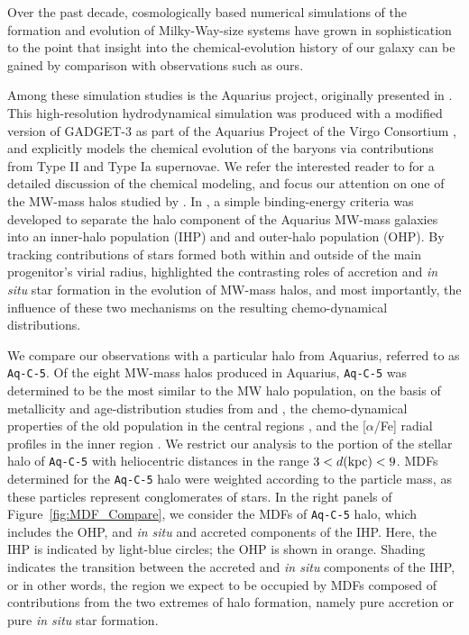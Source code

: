 \documentclass[twocolumn,trackchanges]{aastex63}
\begin{document}
Over the past decade, cosmologically based numerical simulations of the formation and evolution of Milky-Way-size systems have grown in sophistication to the point that insight into the chemical-evolution history of our galaxy can be gained by comparison with observations such as ours.  

Among these simulation studies is the Aquarius project, originally presented in \citet{Scannapieco:2009}. This high-resolution hydrodynamical simulation was produced with a modified version of GADGET-3 \citep{Scannapieco:2005, Scannapieco:2006} as part of the Aquarius Project of the Virgo Consortium \citep{Springel:2008}, and explicitly models the chemical evolution of the baryons via contributions from Type II and Type Ia supernovae. 
We refer the interested reader to \citet{Scannapieco:2009} for a detailed discussion of the chemical modeling, and focus our attention on one of the MW-mass halos studied by \citet{Tissera:2013,Tissera:2014}. In \citet{Tissera:2013}, a simple binding-energy criteria was developed to separate the halo component of the Aquarius MW-mass galaxies into an inner-halo population (IHP) and and outer-halo population (OHP). By tracking contributions of stars formed both within and outside of the main progenitor's virial radius, \citet{Tissera:2014} highlighted the contrasting roles of accretion and \textit{in situ} star formation in the evolution of MW-mass halos, and most importantly, the influence of these two mechanisms on the resulting chemo-dynamical distributions. 

We compare our observations with a particular halo from Aquarius, referred to as \texttt{Aq-C-5}. Of the eight MW-mass halos produced in Aquarius, \texttt{Aq-C-5} was determined to be the most similar to the MW halo population, on the basis of metallicity and age-distribution studies from \citet{Carollo:2018} and \citet{Whitten:2019b}, the chemo-dynamical properties of the old population in the central regions \citep{Tissera:2018}, and the [$\alpha$/Fe] radial profiles in the inner region \citep{Fernandez-Alvar:2019}. We restrict our analysis to the portion of the stellar halo of \texttt{Aq-C-5} with heliocentric distances in the range $3 < d \rm{(kpc)} < 9$. MDFs determined for the \texttt{Aq-C-5} halo were weighted according to the particle mass, as these particles represent conglomerates of stars. In the right panels of Figure~\ref{fig:MDF_Compare}, we consider the MDFs of \texttt{Aq-C-5} halo, which includes the OHP, and \textit{in situ} and accreted components of the IHP. Here, the IHP is indicated by light-blue circles; the OHP is shown in orange. Shading indicates the transition between the accreted and \textit{in situ} components of the IHP, or in other words, the region we expect to be occupied by MDFs composed of contributions from the two extremes of halo formation, namely pure accretion or pure \textit{in situ} star formation.
\end{document}
